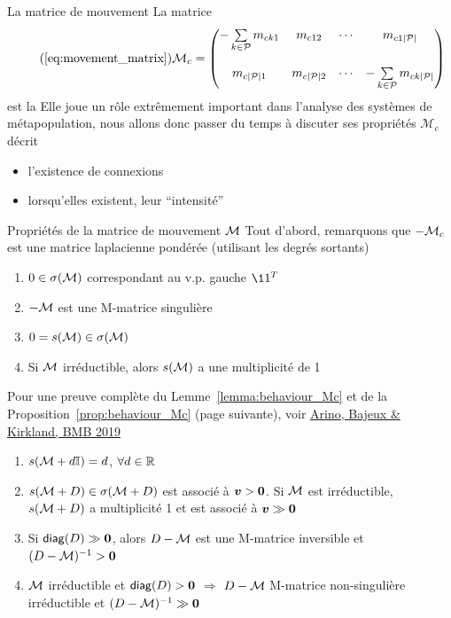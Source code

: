 \documentclass[aspectratio=169]{beamer}\usepackage[]{graphicx}\usepackage[]{xcolor}
\begin{document}
\begin{frame}{La matrice de mouvement}
	La matrice
	\begin{equation}\tag{\ref{eq:movement_matrix}}
		\mathcal{M}_c =
		\begin{pmatrix}
		-\sum\limits_{k\in\P}m_{ck1} & m_{c12} & \cdots & m_{c1|\P|} \\
		& & & \\
		m_{c|\P|1} & m_{c|\P|2} & \cdots & -\sum\limits_{k\in\P}m_{ck|\P|}
		\end{pmatrix}
	\end{equation}
	est la 
	\vfill
	Elle joue un rôle extrêmement important dans l'analyse des systèmes de métapopulation, nous allons donc passer du temps à discuter ses propriétés
	\vfill
$\mathcal{M}_c$ décrit
\begin{itemize} 
\item l'existence de connexions
\item lorsqu'elles existent, leur ``intensité''
\end{itemize}
\end{frame}

\begin{frame}{Propriétés de la matrice de mouvement $\mathcal{M}$}
	Tout d'abord, remarquons que $-\mathcal{M}_c$ est une matrice laplacienne pondérée (utilisant les degrés sortants)
	\vfill
	\begin{lemma}\label{lemma:behaviour_Mc}
		\begin{enumerate}
			\item $0\in\sigma(\mathcal{M})$ correspondant au v.p. gauche $\11^T$ 
			\item $-\mathcal{M}$ est une M-matrice singulière
			\item $0=s(\mathcal{M})\in\sigma(\mathcal{M})$
			\item Si $\mathcal{M}$ irréductible, alors $s(\mathcal{M})$ a une multiplicité de 1
		\end{enumerate}
	\end{lemma}
	\vfill
	Pour une preuve complète du Lemme~\ref{lemma:behaviour_Mc} et de la Proposition~\ref{prop:behaviour_Mc} (page suivante), voir \href{http://dx.doi.org/10.1007/s11538-019-00593-1}{Arino, Bajeux \& Kirkland, BMB 2019}
\end{frame}

\begin{frame}
	\begin{proposition}
		\label{prop:behaviour_Mc}
		\begin{enumerate}
			\item $s(\mathcal{M}+d\mathbb{I})=d$, $\forall d\in\mathbb{R}$
			\item $s(\mathcal{M}+D)\in\sigma(\mathcal{M}+D)$ est associé à $\bv>\b0$. 
			Si $\mathcal{M}$ est irréductible, $s(\mathcal{M}+D)$ a  multiplicité 1 et est associé à $\bv\gg \b0$
			\item Si $\diag (D)\gg \b0$, alors $D-\mathcal{M}$ est une M-matrice inversible et $(D-\M)^{-1}> \b0$
			\item $\mathcal{M}$ irréductible et $\diag(D)>\b0$ $\Longrightarrow$ $D-\mathcal{M}$ M-matrice non-singulière irréductible et $(D-\M)^{-1}\gg \b0$
		\end{enumerate}
	\end{proposition}
\end{frame}
\end{document}
